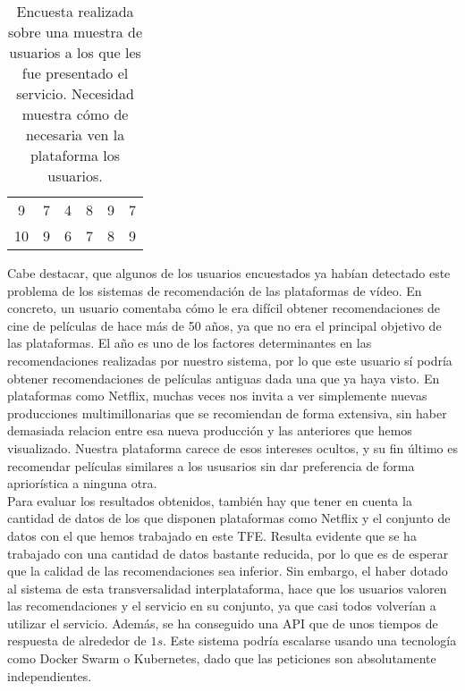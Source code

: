 \begin{table}[H]
{\begin{tabular}{cccccc}
9                                     & 7                                       & 4                                            & 8                                             & 9                                 & 7                                       \\
10                                    & 9                                       & 6                                            & 7                                             & 8                                 & 9                                      
\end{tabular}%
}
\caption{Encuesta realizada sobre una muestra de usuarios a los que les fue presentado el servicio. Necesidad muestra cómo de necesaria ven la plataforma los usuarios.}
\label{tab:satisfaction}
\end{table}

Cabe destacar, que algunos de los usuarios encuestados ya habían detectado este problema de los sistemas de recomendación de las plataformas de vídeo. En concreto, un usuario comentaba cómo le era difícil obtener recomendaciones de cine de películas de hace más de 50 años, ya que no era el principal objetivo de las plataformas. El año es uno de los factores determinantes en las recomendaciones realizadas por nuestro sistema, por lo que este usuario sí podría obtener recomendaciones de películas antiguas dada una que ya haya visto. En plataformas como Netflix, muchas veces nos invita a ver simplemente nuevas producciones multimillonarias que se recomiendan de forma extensiva, sin haber demasiada relacion entre esa nueva producción y las anteriores que hemos visualizado. Nuestra plataforma carece de esos intereses ocultos, y su fin último es recomendar películas similares a los ususarios sin dar preferencia de forma apriorística a ninguna otra.\\

Para evaluar los resultados obtenidos, también hay que tener en cuenta la cantidad de datos de los que disponen plataformas como Netflix y el conjunto de datos con el que hemos trabajado en este TFE. Resulta evidente que se ha trabajado con una cantidad de datos bastante reducida, por lo que es de esperar que la calidad de las recomendaciones sea inferior. Sin embargo, el haber dotado al sistema de esta transversalidad interplataforma, hace que los usuarios valoren las recomendaciones y el servicio en su conjunto, ya que casi todos volverían a utilizar el servicio. Además, se ha conseguido una API que de unos tiempos de respuesta de alrededor de $1 s$. Este sistema podría escalarse usando una tecnología como Docker Swarm o Kubernetes, dado que las peticiones son absolutamente independientes.\\

